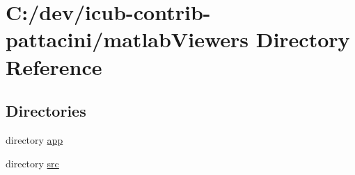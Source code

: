 \section{C\+:/dev/icub-\/contrib-\/pattacini/matlab\+Viewers Directory Reference}
\label{dir_29ff97d5d98568903fd6baa7bbe72e1c}
\subsection*{Directories}
\begin{DoxyCompactItemize}
\item 
directory \hyperlink{dir_58907555cfe8fb553a52e7c9a24e859c}{app}
\item 
directory \hyperlink{dir_36177335618d57f930976cac1ebc0309}{src}
\end{DoxyCompactItemize}
